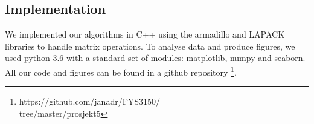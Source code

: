 \subsection{Implementation}
\label{sec:implement}
We implemented our algorithms in C++ using the armadillo and LAPACK libraries to handle matrix operations. To analyse data and produce figures, we used python 3.6 with a standard set of modules: matplotlib, numpy and seaborn. All our code and figures can be found in a github repository \footnote{https://github.com/janadr/FYS3150/ \\tree/master/prosjekt5}.
